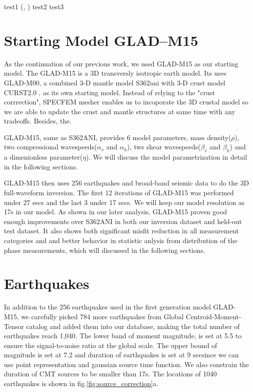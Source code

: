 \documentclass[extra,mreferee]{gji}
\begin{document}
test1 (\cite{zhu2012structure}, \cite{zhu2012structure})
test2 \citep{zhu2015seismic, ekstrom2012global}
test3 \citet{ekstrom2012global}


\section{Starting Model GLAD--M15}

As the continuation of our previous work, we used GLAD-M15 as our
starting model\citep{bozdaug2016global}.
The GLAD-M15 is a 3D transversly isotropic earth model. Its uses
GLAD-M00, a combined 3-D mantle model S362ani \citep{kustowski2008anisotropic}
with 3-D crust model CURST2.0 \citep{bassin2000current}, as its own starting model.
Instead of relying to the "crust corrrection", SPECFEM mesher enables us to incoporate
the 3D crustal model so we are able to update the crust and mantle structures at same
time with any tradeoffs. Besides, the.

GLAD-M15, same as  S362ANI, provides 6 model parameters, mass density($\rho$), two compressional
wavespeeds($\alpha_v$ and $\alpha_h$), tws shear wavespeeds($\beta_v$
and $\beta_h$) and a dimenionless parameter($\eta$). We will discuss
the model parametrization in detail in the following sections.

GLAD-M15 then uses 256 earthquakes and broad-band seismic data to do the 3D full-waveform
inversion\citep{bozdaug2016global}. The first 12 iterations of GLAD-M15 was
performed under 27 secs and the last 3 under 17 secs. We will keep our model
resolution as 17s in our model. As shown in our later analysis,
GLAD-M15 proven good enough improvements over S362ANI in both our inversion
dataset and held-out test dataset. It also shows both significant misfit reduction
in all measurement categories and and better behavior in statistic anlysis from distribution
of the phase measurements, which will discussed in the following sections.

\section{Earthquakes}
In addition to the 256 earthquakes used in the first generation model GLAD-M15, we
carefully picked 784 more earthquakes from Global Centroid-Moment-Tensor catalog\citep{}
and added them into our database, making the total number of earthquakes reach 1,040.
The lower band of moment magnitude, is set at 5.5 to ensure the signal-to-noise ratio at
the global scale. The upper bound of magnitude is set at 7.2 and duration of earthquakes
is set at 9 secsince we can use point representation and gaussian source time function.
We also constrain the duration of CMT sources to be smaller than 17s. The locations of 1040
earthquakes is shown in fig.\ref{fig:source_correction}a.
\end{document}
